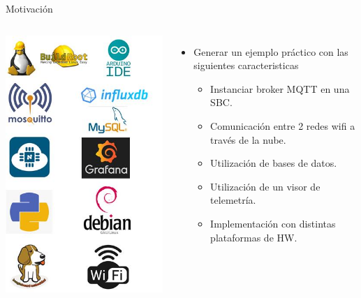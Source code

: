 \documentclass[aspectratio= 43]{beamer}
\begin{document}
\begin{frame}{Motivación}
   \begin{columns}
      \includegraphics [width=\textwidth]{./visio/Filmina_2.jpg}
      \begin{itemize}
       \item{Generar un ejemplo práctico con las siguientes caracteristicas}
      \begin{itemize}
                   \item{Instanciar broker MQTT en una SBC.}
	         \item{Comunicación entre 2 redes wifi a través de la nube.}
	         \item{Utilización de bases de datos.}
	         \item{Utilización de un visor de telemetría.}
	         \item{Implementación con distintas plataformas de HW.}
      \end{itemize}
      \end{itemize}
   \end{columns}
\end{frame}
\end{document}
